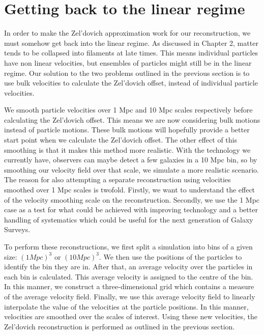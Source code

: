 \section{Getting back to the linear regime}

In order to make the Zel'dovich approximation work for our reconstruction, we must somehow get back into the linear regime. As discussed in Chapter 2, matter tends to be collapsed into filaments at late times. This means individual particles have non linear velocities, but ensembles of particles might still be in the linear regime. Our solution to the two problems outlined in the previous section is to use bulk velocities to calculate the Zel'dovich offset, instead of individual particle velocities.

We smooth particle velocities over 1 Mpc and 10 Mpc scales respectively before calculating the Zel'dovich offset. This means we are now considering bulk motions instead of particle motions. These bulk motions will hopefully provide a better start point when we calculate the Zel'dovich offset. The other effect of this smoothing is that it makes this method more realistic. With the technology we currently have, observers can maybe detect a few galaxies in a 10 Mpc bin, so by smoothing our velocity field over that scale, we simulate a more realistic scenario. The reason for also attempting a separate reconstruction using velocities smoothed over 1 Mpc scales is twofold. Firstly, we want to understand the effect of the velocity smoothing scale on the reconstruction. Secondly, we use the 1 Mpc case as a test for what could be achieved with improving technology and a better handling of systematics which could be useful for the next generation of Galaxy Surveys.

To perform these reconstructions, we first split a simulation into bins of a given size: $(1 Mpc)^3$ or $(10 Mpc)^3$. We then use the positions of the particles to identify the bin they are in. After that, an average velocity over the particles in each bin is calculated. This average velocity is assigned to the centre of the bin. In this manner, we construct a three-dimensional grid which contains a measure of the average velocity field. Finally, we use this average velocity field to linearly interpolate the value of the velocities at the particle positions. In this manner, velocities are smoothed over the scales of interest. Using these new velocities, the Zel'dovich reconstruction is performed as outlined in the previous section. 

